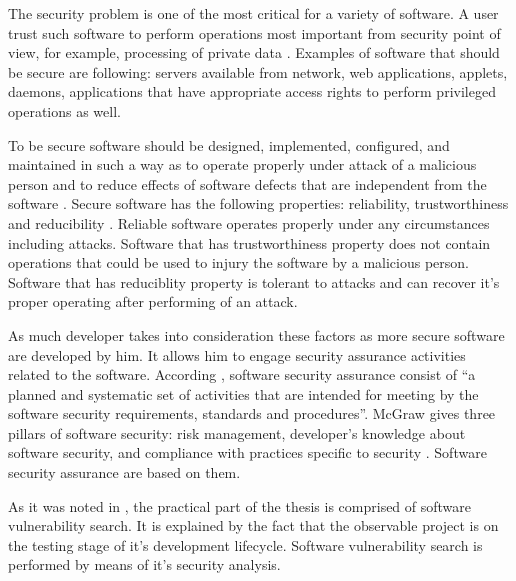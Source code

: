 %
The security problem is one of the most critical for a variety of software. 
%
A user trust such software to perform operations most important from security point of view, for example, processing of private data . 
%
Examples of software that should be secure are following: servers available from network, web applications, applets, daemons, applications that have appropriate access rights to perform privileged operations as well. 

%
To be secure software should be designed, implemented, configured, and maintained in such a way as to operate properly under attack of a malicious person and to reduce effects of software defects that are independent from the software . 
%
Secure software has the following properties: reliability, trustworthiness and reducibility . 
%
Reliable software operates properly under any circumstances\T{,} including attacks. 
%
Software that has trustworthiness property does not contain operations that could be used to injury the software by a malicious person. 
%
Software that has reduciblity property is tolerant to attacks and can recover it's proper operating after performing of an attack. 

%
As much developer takes into consideration these factors as more secure software are developed by him. 
%
It allows him to engage security assurance activities related to the software. 
%
According , software security assurance consist of ``a planned and systematic set of activities that are intended for meeting by the software security requirements, standards and procedures''. 
%
McGraw gives three pillars of software security: risk management, developer's knowledge about software security, and compliance with practices specific to security .
%
Software security assurance are based on them. 

%
As it was noted in , the practical part of the thesis is comprised of software vulnerability search. 
%
It is explained by the fact that the observable project is on the testing stage of it's development lifecycle. 
%
Software vulnerability search is performed by means of it's security analysis. 